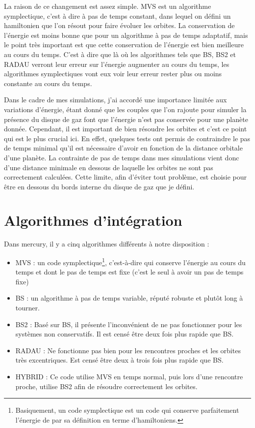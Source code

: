 La raison de ce changement est assez simple. MVS est un algorithme symplectique, c'est à dire à pas de temps constant, dans lequel on défini un hamiltonien que l'on résout pour faire évoluer les orbites. La conservation de l'énergie est moins bonne que pour un algorithme à pas de temps adaptatif, mais le point très important est que cette conservation de l'énergie est bien meilleure au cours du temps. C'est à dire que là où les algorithmes tels que BS, BS2 et RADAU verront leur erreur sur l'énergie augmenter au cours du temps, les algorithmes symplectiques vont eux voir leur erreur rester plus ou moins constante au cours du temps. 

Dans le cadre de mes simulations, j'ai accordé une importance limitée aux variations d'énergie, étant donné que les couples que l'on rajoute pour simuler la présence du disque de gaz font que l'énergie n'est pas conservée pour une planète donnée. Cependant, il est important de bien résoudre les orbites et c'est ce point qui est le plus crucial ici. En effet, quelques tests ont permis de contraindre le pas de temps minimal qu'il est nécessaire d'avoir en fonction de la distance orbitale d'une planète. La contrainte de pas de temps dans mes simulations vient donc d'une distance minimale en dessous de laquelle les orbites ne sont pas correctement calculées. Cette limite, afin d'éviter tout problème, est choisie pour être en dessous du bords interne du disque de gaz que je défini.

\section{Algorithmes d'intégration}
Dans mercury, il y a cinq algorithmes différents à notre disposition :
\begin{itemize}
\item MVS \citep{wisdom1991symplectic} : un code symplectique\footnote{Basiquement, un code symplectique est un code qui conserve parfaitement l'énergie de par sa définition en terme d'hamiltoniens.}, c'est-à-dire qui conserve l'énergie au cours du temps et dont le pas de temps est fixe (c'est le seul à avoir un pas de temps fixe)
\item BS \citep{stoer1980introduction} : un algorithme à pas de temps variable, réputé robuste et plutôt long à tourner.
\item BS2 \citep{press1992numerical} : Basé sur BS, il présente l'inconvénient de ne pas fonctionner pour les systèmes non conservatifs. Il est censé être deux fois plus rapide que BS.
\item RADAU \citep{everhart1985efficient} : Ne fonctionne pas bien pour les rencontres proches et les orbites très excentriques. Est censé être deux à trois fois plus rapide que BS.
\item HYBRID \citep{chambers1999hybrid} : Ce code utilise MVS en temps normal, puis lors d'une rencontre proche, utilise BS2 afin de résoudre correctement les orbites.
\end{itemize}

